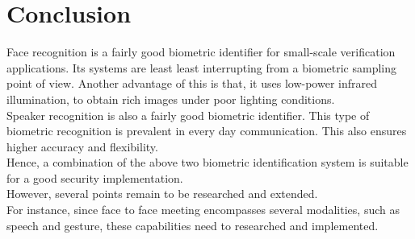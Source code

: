\chapter{Conclusion}

Face recognition is a fairly good biometric identifier for small-scale verification applications. Its systems are least least interrupting from a biometric sampling point of view. Another advantage of this is that, it uses low-power infrared illumination, to obtain rich images under poor lighting conditions. \\
Speaker recognition is also a fairly good biometric identifier. This type of biometric recognition is prevalent in every day communication. This also ensures higher accuracy and flexibility. \\
Hence, a combination of the above two biometric identification system is suitable for a good security implementation. \\
However, several points remain to be researched and extended. \\
For instance, since face to face meeting encompasses several modalities, such as speech and gesture, these capabilities need to researched and implemented. \\
